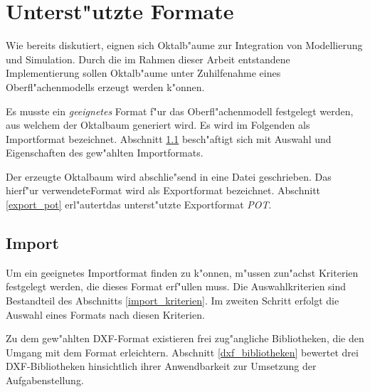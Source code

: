 %
%

\chapter{Unterst"utzte Formate}
\label{eval}
Wie bereits diskutiert, eignen sich Oktalb"aume zur Integration von 
Modellierung und Simulation. Durch die im Rahmen dieser Arbeit entstandene 
Implementierung sollen Oktalb"aume unter Zuhilfenahme eines 
Oberfl"achenmodells erzeugt werden k"onnen. 

Es musste ein \emph{geeignetes} Format f"ur das Oberfl"achenmodell festgelegt
werden, aus welchem der Oktalbaum generiert wird. Es wird im Folgenden als
Importformat bezeichnet. Abschnitt \ref{import} besch"aftigt sich
mit Auswahl und Eigenschaften des gew"ahlten Importformats.

Der erzeugte Oktalbaum wird abschlie"send in eine Datei geschrieben. 
Das hierf"ur verwendeteFormat wird als Exportformat bezeichnet. Abschnitt 
\ref{export_pot} erl"autertdas unterst"utzte Exportformat \emph{POT}.

\section{Import}
\label{import}
Um ein geeignetes Importformat finden zu k"onnen, m"ussen zun"achst Kriterien 
festgelegt werden, die dieses Format erf"ullen muss. Die Auswahlkriterien
sind Bestandteil des Abschnitts \ref{import_kriterien}. Im zweiten Schritt
erfolgt die Auswahl eines Formats nach diesen Kriterien. 

Zu dem gew"ahlten DXF-Format existieren frei zug"angliche Bibliotheken, die
den Umgang mit dem Format erleichtern. Abschnitt \ref{dxf_bibliotheken} 
bewertet drei DXF-Bibliotheken hinsichtlich ihrer Anwendbarkeit zur Umsetzung 
der Aufgabenstellung.

